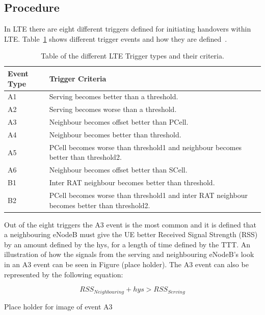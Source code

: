\subsection{Procedure}\label{procedure}
In LTE there are eight different triggers defined for initiating handovers within LTE. Table~\ref{tab:trigger} shows different trigger events and how they are defined~\cite{3gpp2012triggers}. 

\begin{table}[H]
  \begin{center}
    \begin{tabular}{| l | p{11.1cm} |}
  	  \hline
      Event Type & Trigger Criteria \\ \hline
      A1 & Serving becomes better than a threshold. \\
      A2 & Serving becomes worse than a threshold. \\
      A3 & Neighbour becomes offset better than \ac{PCell}. \\
      A4 & Neighbour becomes better than threshold. \\
      A5 & \ac{PCell} becomes worse than threshold1 and neighbour becomes better than threshold2. \\
      A6 & Neighbour becomes offset better than \ac{SCell}. \\
      B1 & Inter RAT neighbour becomes better than threshold. \\
      B2 & \ac{PCell} becomes worse than threshold1 and inter RAT neighbour becomes better than threshold2. \\
      \hline
  	\end{tabular}
  \end{center}
  \caption{Table of the different LTE Trigger types and their criteria.}
  \label{tab:trigger}
\end{table}

Out of the eight triggers the A3 event is the most common and it is defined that a neighbouring eNodeB must give the UE better Received Signal Strength (RSS) by an amount defined by the hys, for a length of time defined by the TTT.  An illustration of how the signals from the serving and neighbouring eNodeB’s look in an A3 event can be seen in Figure (place holder). The A3 event can also be represented by the following equation:

\begin{equation}
RSS_{Neighbouring} + hys > RSS_{Serving}
\end{equation}
 
Place holder for image of event A3

